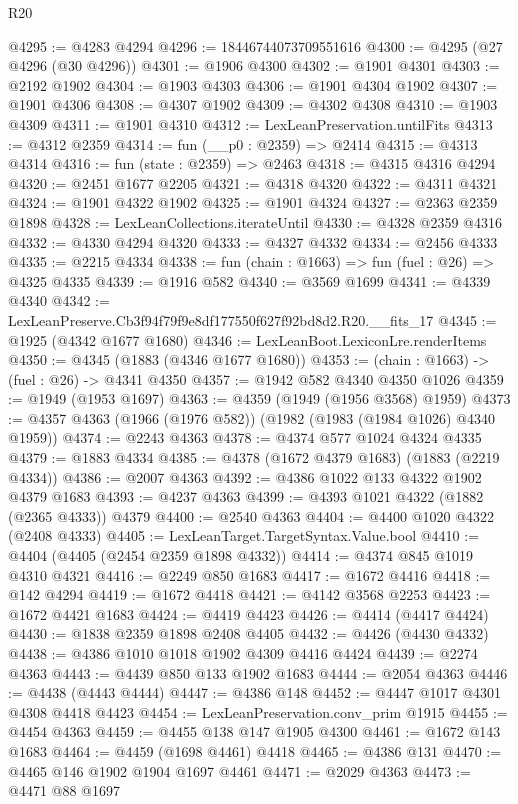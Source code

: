 \begin{lexlean}{R20}
\begin{coremodule}
@4295 := @4283 @4294
@4296 := 18446744073709551616
@4300 := @4295 (@27 @4296 (@30 @4296))
@4301 := @1906 @4300
@4302 := @1901 @4301
@4303 := @2192 @1902
@4304 := @1903 @4303
@4306 := @1901 @4304 @1902
@4307 := @1901 @4306
@4308 := @4307 @1902
@4309 := @4302 @4308
@4310 := @1903 @4309
@4311 := @1901 @4310
@4312 := LexLeanPreservation.untilFits
@4313 := @4312 @2359
@4314 := fun (__p0 : @2359) => @2414
@4315 := @4313 @4314
@4316 := fun (state : @2359) => @2463
@4318 := @4315 @4316 @4294
@4320 := @2451 @1677 @2205
@4321 := @4318 @4320
@4322 := @4311 @4321
@4324 := @1901 @4322 @1902
@4325 := @1901 @4324
@4327 := @2363 @2359 @1898
@4328 := LexLeanCollections.iterateUntil
@4330 := @4328 @2359 @4316
@4332 := @4330 @4294 @4320
@4333 := @4327 @4332
@4334 := @2456 @4333
@4335 := @2215 @4334
@4338 := fun (chain : @1663) => fun (fuel : @26) => @4325 @4335
@4339 := @1916 @582
@4340 := @3569 @1699
@4341 := @4339 @4340
@4342 := LexLeanPreserve.Cb3f94f79f9e8df177550f627f92bd8d2.R20.__fits_17
@4345 := @1925 (@4342 @1677 @1680)
@4346 := LexLeanBoot.LexiconLre.renderItems
@4350 := @4345 (@1883 (@4346 @1677 @1680))
@4353 := (chain : @1663) -> (fuel : @26) -> @4341 @4350
@4357 := @1942 @582 @4340 @4350 @1026
@4359 := @1949 (@1953 @1697)
@4363 := @4359 (@1949 (@1956 @3568) @1959)
@4373 := @4357 @4363 (@1966 (@1976 @582)) (@1982 (@1983 (@1984 @1026) @4340 @1959))
@4374 := @2243 @4363
@4378 := @4374 @577 @1024 @4324 @4335
@4379 := @1883 @4334
@4385 := @4378 (@1672 @4379 @1683) (@1883 (@2219 @4334))
@4386 := @2007 @4363
@4392 := @4386 @1022 @133 @4322 @1902 @4379 @1683
@4393 := @4237 @4363
@4399 := @4393 @1021 @4322 (@1882 (@2365 @4333)) @4379
@4400 := @2540 @4363
@4404 := @4400 @1020 @4322 (@2408 @4333)
@4405 := LexLeanTarget.TargetSyntax.Value.bool
@4410 := @4404 (@4405 (@2454 @2359 @1898 @4332))
@4414 := @4374 @845 @1019 @4310 @4321
@4416 := @2249 @850 @1683
@4417 := @1672 @4416
@4418 := @142 @4294
@4419 := @1672 @4418
@4421 := @4142 @3568 @2253
@4423 := @1672 @4421 @1683
@4424 := @4419 @4423
@4426 := @4414 (@4417 @4424)
@4430 := @1838 @2359 @1898 @2408 @4405
@4432 := @4426 (@4430 @4332)
@4438 := @4386 @1010 @1018 @1902 @4309 @4416 @4424
@4439 := @2274 @4363
@4443 := @4439 @850 @133 @1902 @1683
@4444 := @2054 @4363
@4446 := @4438 (@4443 @4444)
@4447 := @4386 @148
@4452 := @4447 @1017 @4301 @4308 @4418 @4423
@4454 := LexLeanPreservation.conv_prim @1915
@4455 := @4454 @4363
@4459 := @4455 @138 @147 @1905 @4300
@4461 := @1672 @143 @1683
@4464 := @4459 (@1698 @4461) @4418
@4465 := @4386 @131
@4470 := @4465 @146 @1902 @1904 @1697 @4461
@4471 := @2029 @4363
@4473 := @4471 @88 @1697

\end{coremodule}
\end{lexlean}
